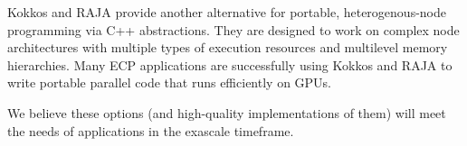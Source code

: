 Kokkos and RAJA provide another alternative for portable,
heterogenous-node programming via C++ abstractions. They
are designed to work on complex node architectures
with multiple types of execution resources and multilevel memory
hierarchies. Many ECP applications are successfully using Kokkos and
RAJA to write portable parallel code that runs efficiently on GPUs.

We believe these options (and high-quality implementations of them) will
meet the needs of applications in the exascale timeframe. 
